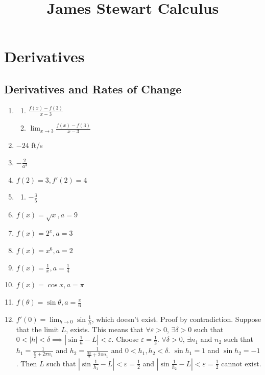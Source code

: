 \documentclass{article}
\title{James Stewart Calculus}
\author{}
\date{}
\begin{document}
\maketitle
\setcounter{section}{1}
\section{Derivatives}
\subsection{Derivatives and Rates of Change}
\begin{enumerate}
  \item
    \begin{enumerate}
      \item $\frac{f(x)-f(3)}{x-3}$
      \item $\lim_{x\to3}\frac{f(x)-f(3)}{x-3}$
    \end{enumerate}
    \setcounter{enumi}{12}
  \item $-24$ ft/s
    \setcounter{enumi}{14}
  \item $-\frac{2}{a^3}$
    \setcounter{enumi}{20}
  \item $f(2)=3, f'(2)=4$
    \setcounter{enumi}{28}
  \item
    \begin{enumerate}
      \item $-\frac{3}{5}$
    \end{enumerate}
    \setcounter{enumi}{36}
  \item $f(x)=\sqrt{x}, a=9$
  \item $f(x)=2^x, a=3$
  \item $f(x)=x^6, a=2$
  \item $f(x)=\frac{1}{x}, a=\frac{1}{4}$
  \item $f(x)=\cos{x}, a=\pi$
  \item $f(\theta)=\sin{\theta}, a=\frac{\pi}{6}$
    \setcounter{enumi}{58}
  \item $f'(0)=\lim_{h\to0}\sin\frac{1}{h}$, which doesn't exist. Proof by contradiction. Suppose
    that the limit $L$, exists. This means that $\forall\varepsilon>0$, $\exists\delta>0$ such that
    $0<|h|<\delta\implies\left|\sin\frac{1}{h}-L\right|<\varepsilon$. Choose $\varepsilon=
    \frac{1}{2}$. $\forall\delta>0$, $\exists n_1$ and $n_2$ such that $h_1=\frac{1}{\frac{\pi}{2}+
    2\pi n_1}$ and $h_2=\frac{1}{\frac{3\pi}{2}+2\pi n_1}$ and $0<h_1, h_2<\delta$. $\sin{h_1}=1$
    and $\sin{h_2}=-1$. Then $L$ such that $\left|\sin\frac{1}{h_1}-L\right|<\varepsilon=
    \frac{1}{2}$ and $\left|\sin\frac{1}{h_2}-L\right|<\varepsilon=\frac{1}{2}$ cannot exist.
\end{enumerate}
\end{document}
